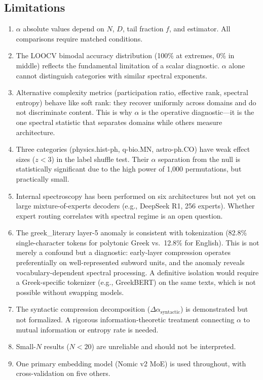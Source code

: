 \documentclass[12pt,letterpaper]{article}
\newcommand{\al}{\alpha}
\newcommand{\dalpha}{\Delta\alpha}
\begin{document}
\subsection{Limitations}

\begin{enumerate}
\item $\al$ absolute values depend on $N$, $D$, tail fraction $f$,
and estimator.  All comparisons require matched conditions.

\item The LOOCV bimodal accuracy distribution (100\% at extremes,
0\% in middle) reflects the fundamental limitation of a scalar
diagnostic.  $\al$ alone cannot distinguish categories with similar
spectral exponents.

\item Alternative complexity metrics (participation ratio, effective
rank, spectral entropy) behave like soft rank: they recover
uniformly across domains and do not discriminate content.  This is
why $\al$ is the operative diagnostic---it is the one spectral
statistic that separates domains while others measure architecture.

\item Three categories (physics.hist-ph, q-bio.MN, astro-ph.CO)
have weak effect sizes ($z < 3$) in the label shuffle test.  Their
$\al$ separation from the null is statistically significant due to
the high power of 1{,}000 permutations, but practically small.

\item Internal spectroscopy has been performed on six architectures
but not yet on large mixture-of-experts decoders (e.g., DeepSeek R1,
256 experts).  Whether expert routing correlates with spectral
regime is an open question.

\item The greek\_literary layer-5 anomaly is consistent with
tokenization (82.8\% single-character tokens for polytonic Greek
vs.\ 12.8\% for English).  This is not merely a confound but a
diagnostic: early-layer compression operates preferentially on
well-represented subword units, and the anomaly reveals
vocabulary-dependent spectral processing.  A definitive isolation
would require a Greek-specific tokenizer (e.g., GreekBERT) on the
same texts, which is not possible without swapping models.

\item The syntactic compression decomposition
($\dalpha_{\text{syntactic}}$) is demonstrated but not formalized.
A rigorous information-theoretic treatment connecting $\al$ to
mutual information or entropy rate is needed.

\item Small-$N$ results ($N < 20$) are unreliable and should not
be interpreted.

\item One primary embedding model (Nomic v2 MoE) is used
throughout, with cross-validation on five others.
\end{enumerate}
\end{document}
